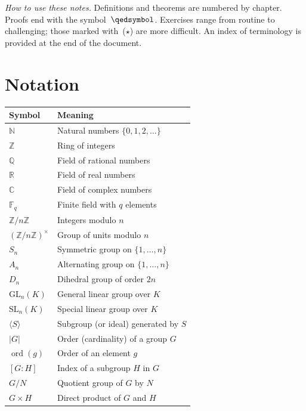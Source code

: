 \documentclass[12pt,a4paper,openany]{book}
\theoremstyle{definition}
\theoremstyle{remark}
\newcommand{\N}{\mathbb{N}}
\newcommand{\Z}{\mathbb{Z}}
\newcommand{\Q}{\mathbb{Q}}
\newcommand{\R}{\mathbb{R}}
\newcommand{\C}{\mathbb{C}}
\newcommand{\F}{\mathbb{F}}
\DeclareMathOperator{\ord}{ord}
\begin{document}
\noindent\textit{How to use these notes.}  Definitions and theorems are
numbered by chapter.  Proofs end with the symbol~$\qedsymbol$.  Exercises
range from routine to challenging; those marked with~($\star$) are more
difficult.  An index of terminology is provided at the end of the document.

\chapter*{Notation}

\begin{tabular}{@{}ll@{}}
  \toprule
  \textbf{Symbol} & \textbf{Meaning}\\
  \midrule
  $\N$         & Natural numbers $\{0,1,2,\ldots\}$\\
  $\Z$         & Ring of integers\\
  $\Q$         & Field of rational numbers\\
  $\R$         & Field of real numbers\\
  $\C$         & Field of complex numbers\\
  $\F_q$       & Finite field with $q$ elements\\
  $\Z/n\Z$     & Integers modulo $n$\\
  $(\Z/n\Z)^\times$ & Group of units modulo $n$\\
  $S_n$        & Symmetric group on $\{1,\ldots,n\}$\\
  $A_n$        & Alternating group on $\{1,\ldots,n\}$\\
  $D_n$        & Dihedral group of order $2n$\\
  $\text{GL}_n(K)$ & General linear group over $K$\\
  $\text{SL}_n(K)$ & Special linear group over $K$\\
  $\langle S\rangle$ & Subgroup (or ideal) generated by $S$\\
  $|G|$        & Order (cardinality) of a group $G$\\
  $\ord(g)$    & Order of an element $g$\\
  $[G:H]$      & Index of a subgroup $H$ in $G$\\
  $G/N$        & Quotient group of $G$ by $N$\\
  $G\times H$  & Direct product of $G$ and $H$\\

\end{tabular}
\end{document}
